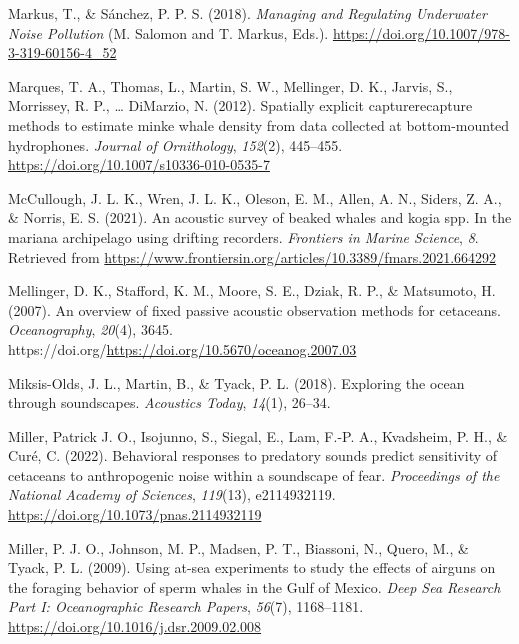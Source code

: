 \documentclass[
]{article}
\newlength{\cslhangindent}
\newlength{\cslentryspacingunit} %
\newenvironment{CSLReferences}[2] %
 {%
  \setlength{\parindent}{0pt}
  \ifodd #1
  \let\oldpar\par
  \def\par{\hangindent=\cslhangindent\oldpar}
  \fi
  \setlength{\parskip}{#2\cslentryspacingunit}
 }%
 {}
\begin{document}
\begin{CSLReferences}{1}{0}
\leavevmode{}%
Markus, T., \& Sánchez, P. P. S. (2018). \emph{Managing and Regulating
Underwater Noise Pollution} (M. Salomon and T. Markus, Eds.).
\url{https://doi.org/10.1007/978-3-319-60156-4_52}

\leavevmode{}%
Marques, T. A., Thomas, L., Martin, S. W., Mellinger, D. K., Jarvis, S.,
Morrissey, R. P., \ldots{} DiMarzio, N. (2012). Spatially explicit
capture{\textendash}recapture methods to estimate minke whale density
from data collected at bottom-mounted hydrophones. \emph{Journal of
Ornithology}, \emph{152}(2), 445--455.
\url{https://doi.org/10.1007/s10336-010-0535-7}

\leavevmode{}%
McCullough, J. L. K., Wren, J. L. K., Oleson, E. M., Allen, A. N.,
Siders, Z. A., \& Norris, E. S. (2021). An acoustic survey of beaked
whales and kogia spp. In the mariana archipelago using drifting
recorders. \emph{Frontiers in Marine Science}, \emph{8}. Retrieved from
\url{https://www.frontiersin.org/articles/10.3389/fmars.2021.664292}

\leavevmode{}%
Mellinger, D. K., Stafford, K. M., Moore, S. E., Dziak, R. P., \&
Matsumoto, H. (2007). An overview of fixed passive acoustic observation
methods for cetaceans. \emph{Oceanography}, \emph{20}(4), 3645.
https://doi.org/\url{https://doi.org/10.5670/oceanog.2007.03}

\leavevmode{}%
Miksis-Olds, J. L., Martin, B., \& Tyack, P. L. (2018). Exploring the
ocean through soundscapes. \emph{Acoustics Today}, \emph{14}(1), 26--34.

\leavevmode{}%
Miller, Patrick J. O., Isojunno, S., Siegal, E., Lam, F.-P. A.,
Kvadsheim, P. H., \& Curé, C. (2022). Behavioral responses to predatory
sounds predict sensitivity of cetaceans to anthropogenic noise within a
soundscape of fear. \emph{Proceedings of the National Academy of
Sciences}, \emph{119}(13), e2114932119.
\url{https://doi.org/10.1073/pnas.2114932119}

\leavevmode{}%
Miller, P. J. O., Johnson, M. P., Madsen, P. T., Biassoni, N., Quero,
M., \& Tyack, P. L. (2009). Using at-sea experiments to study the
effects of airguns on the foraging behavior of sperm whales in the Gulf
of Mexico. \emph{Deep Sea Research Part I: Oceanographic Research
Papers}, \emph{56}(7), 1168--1181.
\url{https://doi.org/10.1016/j.dsr.2009.02.008}


\end{CSLReferences}
\end{document}

